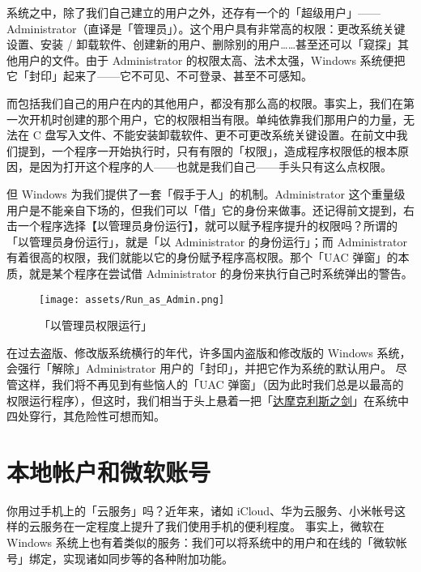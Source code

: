 系统之中，除了我们自己建立的用户之外，还存有一个的「超级用户」——Administrator（直译是「管理员」）。这个用户具有非常高的权限：更改系统关键设置、安装 / 卸载软件、创建新的用户、删除别的用户……甚至还可以「窥探」其他用户的文件。由于 Administrator 的权限太高、法术太强，Windows 系统便把它「封印」起来了——它不可见、不可登录、甚至不可感知。

而包括我们自己的用户在内的其他用户，都没有那么高的权限。事实上，我们在第一次开机时创建的那个用户，它的权限相当有限。单纯依靠我们那用户的力量，无法在 C 盘写入文件、不能安装卸载软件、更不可更改系统关键设置。在前文中我们提到，一个程序一开始执行时，只有有限的「权限」，造成程序权限低的根本原因，是因为打开这个程序的人——也就是我们自己——手头只有这么点权限。

但 Windows 为我们提供了一套「假手于人」的机制。Administrator 这个重量级用户是不能亲自下场的，但我们可以「借」它的身份来做事。还记得前文提到，右击一个程序选择【以管理员身份运行】，就可以赋予程序提升的权限吗？所谓的「以管理员身份运行」，就是「以 Administrator 的身份运行」；而 Administrator 有着很高的权限，我们就能以它的身份赋予程序高权限。那个「UAC 弹窗」的本质，就是某个程序在尝试借 Administrator 的身份来执行自己时系统弹出的警告。

\begin{figure}[htb!]
  \centering
  \texttt{[image: assets/Run\_as\_Admin.png]}
  \caption{「以管理员权限运行」}
  \label{run-as-admin}
\end{figure}

\begin{note}
  在过去盗版、修改版系统横行的年代，许多国内盗版和修改版的 Windows 系统，会强行「解除」Administrator 用户的「封印」，并把它作为系统的默认用户。
  尽管这样，我们将不再见到有些恼人的「UAC 弹窗」（因为此时我们总是以最高的权限运行程序），但这时，我们相当于头上悬着一把「\href{https://baike.baidu.com/item/%E8%BE%BE%E6%91%A9%E5%85%8B%E5%88%A9%E6%96%AF%E4%B9%8B%E5%89%91/231450}{达摩克利斯之剑}」在系统中四处穿行，其危险性可想而知。
\end{note}

\section{本地帐户和微软账号}

你用过手机上的「云服务」吗？近年来，诸如 iCloud、华为云服务、小米帐号这样的云服务在一定程度上提升了我们使用手机的便利程度。
事实上，微软在 Windows 系统上也有着类似的服务：我们可以将系统中的用户和在线的「微软帐号」绑定，实现诸如同步等的各种附加功能。

